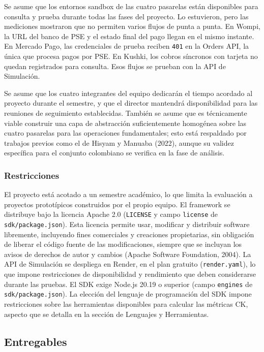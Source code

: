 Se asume que los entornos sandbox de las cuatro pasarelas están disponibles para consulta y prueba durante todas las fases del proyecto. Lo estuvieron, pero las mediciones mostraron que no permiten varios flujos de punta a punta. En Wompi, la URL del banco de PSE y el estado final del pago llegan en el mismo instante. En Mercado Pago, las credenciales de prueba reciben \texttt{401} en la Orders API, la única que procesa pagos por PSE. En Kushki, los cobros síncronos con tarjeta no quedan registrados para consulta. Esos flujos se prueban con la API de Simulación.

Se asume que los cuatro integrantes del equipo dedicarán el tiempo acordado al proyecto durante el semestre, y que el director mantendrá disponibilidad para las reuniones de seguimiento establecidas. También se asume que es técnicamente viable construir una capa de abstracción suficientemente homogénea sobre las cuatro pasarelas para las operaciones fundamentales; esto está respaldado por trabajos previos como el de Hisyam y Manuaba (2022), aunque su validez específica para el conjunto colombiano se verifica en la fase de análisis.

\subsubsection{Restricciones}

El proyecto está acotado a un semestre académico, lo que limita la evaluación a proyectos prototípicos construidos por el propio equipo. El framework se distribuye bajo la licencia Apache 2.0 (\texttt{LICENSE} y campo \texttt{license} de \texttt{sdk/package.json}). Esta licencia permite usar, modificar y distribuir software libremente, incluyendo fines comerciales y creaciones propietarias, sin obligación de liberar el código fuente de las modificaciones, siempre que se incluyan los avisos de derechos de autor y cambios (Apache Software Foundation, 2004). La API de Simulación se despliega en Render, en el plan gratuito (\texttt{render.yaml}), lo que impone restricciones de disponibilidad y rendimiento que deben considerarse durante las pruebas. El SDK exige Node.js 20.19 o superior (campo \texttt{engines} de \texttt{sdk/package.json}). La elección del lenguaje de programación del SDK impone restricciones sobre las herramientas disponibles para calcular las métricas CK, aspecto que se detalla en la sección de Lenguajes y Herramientas.

\subsection{Entregables}

